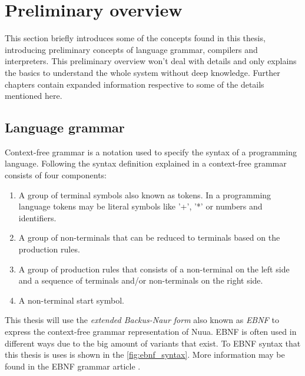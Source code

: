 \section{Preliminary overview}

This section briefly introduces some of the concepts found in this thesis, introducing preliminary concepts of language grammar, compilers and interpreters.
This preliminary overview won't deal with details and only explains the basics to understand the whole system without deep knowledge.
Further chapters contain expanded information respective to some of the details mentioned here.

\subsection{Language grammar}

Context-free grammar is a notation used to specify the syntax of a programming language. Following the syntax definition explained
in \autocite[Section~2.2]{compilers} a context-free grammar consists of four components:

\begin{enumerate}
    \item A group of terminal symbols also known as tokens. In a programming language tokens may be literal symbols like '+', '*' or numbers and identifiers.
    \item A group of non-terminals that can be reduced to terminals based on the production rules.
    \item A group of production rules that consists of a non-terminal on the left side and a sequence of terminals and/or non-terminals on the right side.
    \item A non-terminal start symbol.
\end{enumerate}

This thesis will use the \emph{extended Backus-Naur form} also known as \emph{EBNF} to express the context-free grammar representation of Nuua.
EBNF is often used in different ways due to the big amount of variants that exist. To EBNF syntax that this thesis is uses is shown in the
\autoref{fig:ebnf_syntax}. More information may be found in the EBNF grammar article \autocite{EBNF_grammar}.

